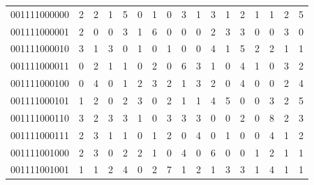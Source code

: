 \documentclass[10pt,a4paper]{article}
\begin{document}
\begin{longtable}{ |c|c|c|c|c|c|c|c|c|c|c|c|c|c|c|c|c| }
    001111000000              & 2                            & 2                                & 1                            & 5                              & 0   & 1   & 0   & 3   & 1   & 3   & 1   & 2   & 1   & 1   & 2   & 5   \\
    001111000001              & 2                            & 0                                & 0                            & 3                              & 1   & 6   & 0   & 0   & 0   & 2   & 3   & 3   & 0   & 0   & 3   & 0   \\
    001111000010              & 3                            & 1                                & 3                            & 0                              & 1   & 0   & 1   & 0   & 0   & 4   & 1   & 5   & 2   & 2   & 1   & 1   \\
    001111000011              & 0                            & 2                                & 1                            & 1                              & 0   & 2   & 0   & 6   & 3   & 1   & 0   & 4   & 1   & 0   & 3   & 2   \\
    001111000100              & 0                            & 4                                & 0                            & 1                              & 2   & 3   & 2   & 1   & 3   & 2   & 0   & 4   & 0   & 0   & 2   & 4   \\
    001111000101              & 1                            & 2                                & 0                            & 2                              & 3   & 0   & 2   & 1   & 1   & 4   & 5   & 0   & 0   & 3   & 2   & 5   \\
    001111000110              & 3                            & 2                                & 3                            & 3                              & 1   & 0   & 3   & 3   & 3   & 0   & 0   & 2   & 0   & 8   & 2   & 3   \\
    001111000111              & 2                            & 3                                & 1                            & 1                              & 0   & 1   & 2   & 0   & 4   & 0   & 1   & 0   & 0   & 4   & 1   & 2   \\
    001111001000              & 2                            & 3                                & 0                            & 2                              & 2   & 1   & 0   & 4   & 0   & 6   & 0   & 0   & 1   & 2   & 1   & 1   \\
    001111001001              & 1                            & 1                                & 2                            & 4                              & 0   & 2   & 7   & 1   & 2   & 1   & 3   & 3   & 1   & 4   & 1   & 1   \\

\end{longtable}
\end{document}
